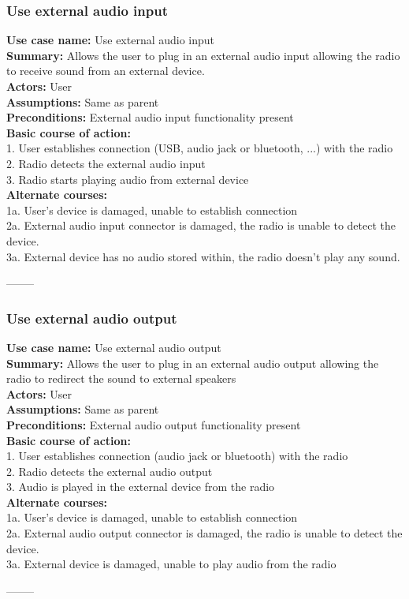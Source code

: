 \documentclass[11pt]{article}
\begin{document}
\subsubsection{Use external audio input}
\textbf{Use case name:} Use external audio input\\
\textbf{Summary:} Allows the user to plug in an external audio input allowing the radio to receive sound from an external device.\\
\textbf{Actors:} User\\
\textbf{Assumptions:} Same as parent\\
\textbf{Preconditions:} External audio input functionality present\\
\textbf{Basic course of action:}\\
1. User establishes connection (USB, audio jack or bluetooth, ...) with the radio\\
2. Radio detects the external audio input\\
3. Radio starts playing audio from external device\\
\textbf{Alternate courses:}\\
1a. User's device is damaged, unable to establish connection\\
2a. External audio input connector is damaged, the radio is unable to detect the device.\\
3a. External device has no audio stored within, the radio doesn't play any sound.\\
\begin{center}--------\end{center}

\subsubsection{Use external audio output}
\textbf{Use case name:} Use external audio output\\
\textbf{Summary:} Allows the user to plug in an external audio output allowing the radio to redirect the sound to external speakers\\
\textbf{Actors:} User\\
\textbf{Assumptions:} Same as parent\\
\textbf{Preconditions:} External audio output functionality present\\
\textbf{Basic course of action:}\\
1. User establishes connection (audio jack or bluetooth) with the radio\\
2. Radio detects the external audio output\\
3. Audio is played in the external device from the radio\\
\textbf{Alternate courses:}\\
1a. User's device is damaged, unable to establish connection\\
2a. External audio output connector is damaged, the radio is unable to detect the device.\\
3a. External device is damaged, unable to play audio from the radio\\
\begin{center}--------\end{center}
\end{document}
